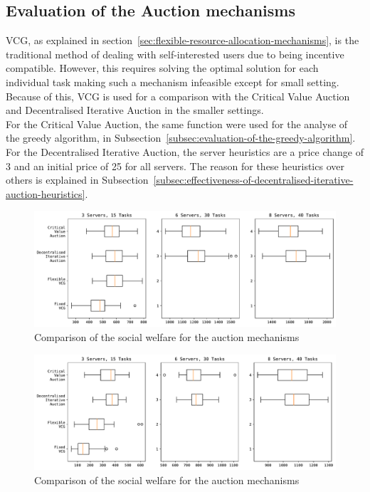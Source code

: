 \subsection{Evaluation of the Auction mechanisms}\label{subsec:evaluation-of-the-auction-mechanisms}
VCG, as explained in section~\ref{sec:flexible-resource-allocation-mechanisms}, is the traditional method of dealing
with self-interested users due to being incentive compatible. However, this requires solving the optimal solution
for each individual task making such a mechanism infeasible except for small setting. Because of this, VCG is used for
a comparison with the Critical Value Auction and Decentralised Iterative Auction in the smaller settings. \\
For the Critical Value Auction, the same function were used for the analyse of the greedy algorithm, in
Subsection~\ref{subsec:evaluation-of-the-greedy-algorithm}. For the Decentralised Iterative Auction, the server
heuristics are a price change of 3 and an initial price of 25 for all servers. The reason for these heuristics over
others is explained in Subsection~\ref{subsec:effectiveness-of-decentralised-iterative-auction-heuristics}.

\begin{figure}[h]
    \centering
    \includegraphics[width=\linewidth]{figs/auctions/multi_setting_social_welfare.pdf}
    \caption{Comparison of the social welfare for the auction mechanisms}
    \label{fig:auction-mechanisms-social-welfare}
\end{figure}

\begin{figure}[h]
    \centering
    \includegraphics[width=\linewidth]{figs/auctions/multi_setting_revenue.pdf}
    \caption{Comparison of the social welfare for the auction mechanisms}
    \label{fig:auction-mechanisms-revenue}
\end{figure}

